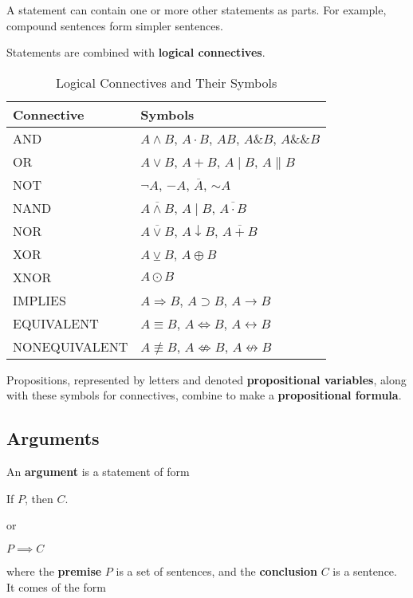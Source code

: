 \documentclass{article}
\begin{document}
    A statement can contain one or more other statements as parts. For example, compound sentences form simpler sentences. 

    \begin{definition}[Connectives]
      Statements are combined with \textbf{logical connectives}. 
      \begin{table}[H]
        \centering
        \begin{tabular}{|l|l|}
        \hline
        \textbf{Connective} & \textbf{Symbols} \\
        \hline
        AND & $A \wedge B$, $A \cdot B$, $AB$, $A \& B$, $A \&\& B$ \\
        \hline
        OR & $A \vee B$, $A + B$, $A \mid B$, $A \parallel B$ \\
        \hline
        NOT & $\neg A$, $-A$, $\overline{A}$, $\sim A$ \\
        \hline
        NAND & $\overline{A \wedge B}$, $A \mid B$, $\overline{A \cdot B}$ \\
        \hline
        NOR & $\overline{A \vee B}$, $A \downarrow B$, $\overline{A + B}$ \\
        \hline
        XOR & $A \veebar B$, $A \oplus B$ \\
        \hline
        XNOR & $A \odot B$ \\
        \hline
        IMPLIES & $A \Rightarrow B$, $A \supset B$, $A \rightarrow B$ \\
        \hline
        EQUIVALENT & $A \equiv B$, $A \Leftrightarrow B$, $A \leftrightarrow B$ \\
        \hline
        NONEQUIVALENT & $A \not\equiv B$, $A \not\Leftrightarrow B$, $A \not\leftrightarrow B$ \\
        \hline
        \end{tabular}
        \caption{Logical Connectives and Their Symbols}
        \label{tab:logical-connectives}
      \end{table} 
    \end{definition}

    Propositions, represented by letters and denoted \textbf{propositional variables}, along with these symbols for connectives, combine to make a \textbf{propositional formula}. 

  \subsection{Arguments} 

    \begin{definition}[Argument]
      An \textbf{argument} is a statement of form 
      \begin{center} 
        If $P$, then $C$. 
      \end{center}
      or 
      \begin{center} 
        $P \implies C$
      \end{center}
      where the \textbf{premise} $P$ is a set of sentences, and the \textbf{conclusion} $C$ is a sentence. It comes of the form 
    \end{definition}
\end{document}
